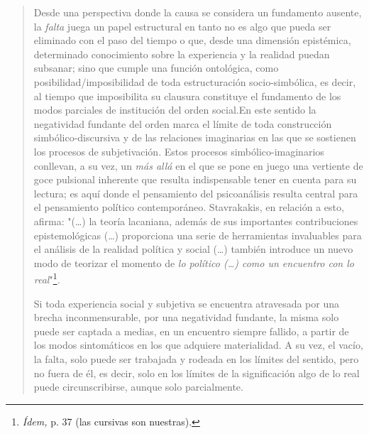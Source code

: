 \begin{quote}
Desde una perspectiva donde la causa se considera un fundamento ausente,
la \emph{falta} juega un papel estructural en tanto no es algo que pueda
ser eliminado con el paso del tiempo o que, desde una dimensión
epistémica, determinado conocimiento sobre la experiencia y la realidad
puedan subsanar; sino que cumple una función ontológica, como
posibilidad/imposibilidad de toda estructuración socio-simbólica, es
decir, al tiempo que imposibilita su clausura constituye el fundamento
de los modos parciales de institución del orden social.En este sentido
la negatividad fundante del orden marca el límite de toda construcción
simbólico-discursiva y de las relaciones imaginarias en las que se
sostienen los procesos de subjetivación. Estos procesos
simbólico-imaginarios conllevan, a su vez, un \emph{más allá} en el que
se pone en juego una vertiente de goce pulsional inherente que resulta
indispensable tener en cuenta para su lectura; es aquí donde el
pensamiento del psicoanálisis resulta central para el pensamiento
político contemporáneo. Stavrakakis, en relación a esto, afirma:
"(\dots) la teoría lacaniana, además de sus importantes
contribuciones epistemológicas (\dots) proporciona una serie de
herramientas invaluables para el análisis de la realidad política y
social (\dots) también introduce un nuevo modo de teorizar el
momento de \emph{lo político (\dots) como un encuentro con lo
real}"\footnote{\emph{Ídem,} p. 37 (las cursivas son nuestras).}\emph{.}

Si toda experiencia social y subjetiva se encuentra atravesada por una
brecha inconmensurable, por una negatividad fundante, la misma solo
puede ser captada a medias, en un encuentro siempre fallido, a partir de
los modos sintomáticos en los que adquiere materialidad. A su vez, el
vacío, la falta, solo puede ser trabajada y rodeada en los límites del
sentido, pero no fuera de él, es decir, solo en los límites de la
significación algo de lo real puede circunscribirse, aunque solo
parcialmente.


\end{quote}
